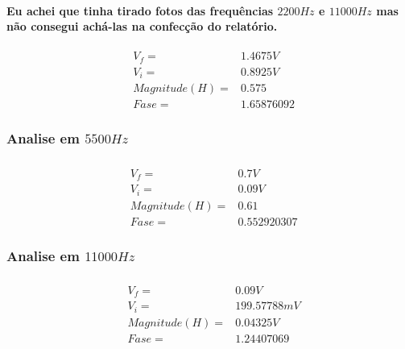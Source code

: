 \documentclass[12pt,twoside, a4paper, twocolumn]{article}
\begin{document}
\paragraph*{Eu achei que tinha tirado fotos das frequências $2200Hz$ e $11000Hz$ mas não consegui achá-las na confecção do relatório.}


\begin{equation*}
    \begin{aligned}
         & V_f =          & 1.4675V    \\
         & V_i =          & 0.8925V    \\
         & Magnitude(H) = & 0.575      \\
         & Fase =         & 1.65876092
    \end{aligned}
\end{equation*}


\subsubsection{Analise em $5500Hz$}
\subparagraph*{}




\begin{equation*}
    \begin{aligned}
         & V_f =          & 0.7V        \\
         & V_i =          & 0.09V       \\
         & Magnitude(H) = & 0.61        \\
         & Fase =         & 0.552920307
    \end{aligned}
\end{equation*}




\subsubsection{Analise em $11000Hz$}
\subparagraph*{}




\begin{equation*}
    \begin{aligned}
         & V_f =          & 0.09V       \\
         & V_i =          & 199.57788mV \\
         & Magnitude(H) = & 0.04325V    \\
         & Fase =         & 1.24407069
    \end{aligned}
\end{equation*}
\end{document}
